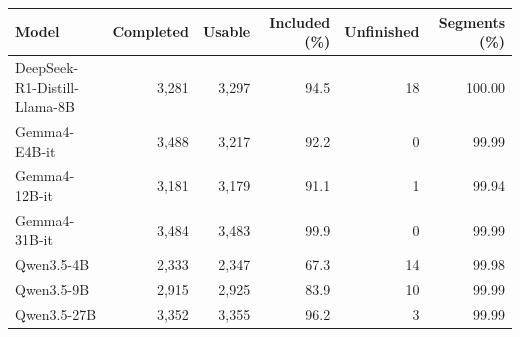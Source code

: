 \begin{tabular}{lrrrrr}
\toprule Model & Completed & Usable & Included (\%) & Unfinished & Segments (\%) \\
\midrule
DeepSeek-R1-Distill-Llama-8B & 3,281 & 3,297 & 94.5 & 18 & 100.00 \\
Gemma4-E4B-it & 3,488 & 3,217 & 92.2 & 0 & 99.99 \\
Gemma4-12B-it & 3,181 & 3,179 & 91.1 & 1 & 99.94 \\
Gemma4-31B-it & 3,484 & 3,483 & 99.9 & 0 & 99.99 \\
Qwen3.5-4B & 2,333 & 2,347 & 67.3 & 14 & 99.98 \\
Qwen3.5-9B & 2,915 & 2,925 & 83.9 & 10 & 99.99 \\
Qwen3.5-27B & 3,352 & 3,355 & 96.2 & 3 & 99.99 \\
\bottomrule
\end{tabular}
